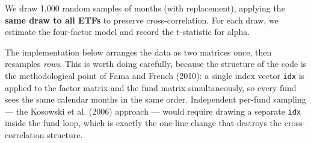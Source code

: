 \documentclass[
  letterpaper,
  DIV=11,
  numbers=noendperiod]{scrartcl}
\begin{document}
We draw 1,000 random samples of months (with replacement), applying the
\textbf{same draw to all ETFs} to preserve cross-correlation. For each
draw, we estimate the four-factor model and record the t-statistic for
alpha.

The implementation below arranges the data as two matrices once, then
resamples \emph{rows}. This is worth doing carefully, because the
structure of the code is the methodological point of Fama and French
(2010): a single index vector \texttt{idx} is applied to the factor
matrix and the fund matrix simultaneously, so every fund sees the same
calendar months in the same order. Independent per-fund sampling --- the
Kosowski et al. (2006) approach --- would require drawing a separate
\texttt{idx} inside the fund loop, which is exactly the one-line change
that destroys the cross-correlation structure.
\end{document}
